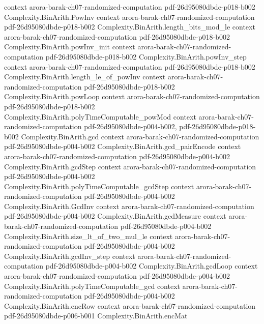 \begin{theorem}
  {context}
  {arora-barak-ch07-randomized-computation}
  {pdf-26d95080dbde-p018-b002}
\proofstep
  {Complexity.BinArith.PowInv}
  {context}
  {arora-barak-ch07-randomized-computation}
  {pdf-26d95080dbde-p018-b002}
\proofstep
  {Complexity.BinArith.length_bits_mod_le}
  {context}
  {arora-barak-ch07-randomized-computation}
  {pdf-26d95080dbde-p018-b002}
\proofstep
  {Complexity.BinArith.powInv_init}
  {context}
  {arora-barak-ch07-randomized-computation}
  {pdf-26d95080dbde-p018-b002}
\proofstep
  {Complexity.BinArith.powInv_step}
  {context}
  {arora-barak-ch07-randomized-computation}
  {pdf-26d95080dbde-p018-b002}
\proofstep
  {Complexity.BinArith.length_le_of_powInv}
  {context}
  {arora-barak-ch07-randomized-computation}
  {pdf-26d95080dbde-p018-b002}
\proofstep
  {Complexity.BinArith.powLoop}
  {context}
  {arora-barak-ch07-randomized-computation}
  {pdf-26d95080dbde-p018-b002}
\proofstep
  {Complexity.BinArith.polyTimeComputable_powMod}
  {context}
  {arora-barak-ch07-randomized-computation}
  {pdf-26d95080dbde-p004-b002,
    pdf-26d95080dbde-p018-b002}
\proofstep
  {Complexity.BinArith.gcd}
  {context}
  {arora-barak-ch07-randomized-computation}
  {pdf-26d95080dbde-p004-b002}
\proofstep
  {Complexity.BinArith.gcd_pairEncode}
  {context}
  {arora-barak-ch07-randomized-computation}
  {pdf-26d95080dbde-p004-b002}
\proofstep
  {Complexity.BinArith.gcdStep}
  {context}
  {arora-barak-ch07-randomized-computation}
  {pdf-26d95080dbde-p004-b002}
\proofstep
  {Complexity.BinArith.polyTimeComputable_gcdStep}
  {context}
  {arora-barak-ch07-randomized-computation}
  {pdf-26d95080dbde-p004-b002}
\proofstep
  {Complexity.BinArith.GcdInv}
  {context}
  {arora-barak-ch07-randomized-computation}
  {pdf-26d95080dbde-p004-b002}
\proofstep
  {Complexity.BinArith.gcdMeasure}
  {context}
  {arora-barak-ch07-randomized-computation}
  {pdf-26d95080dbde-p004-b002}
\proofstep
  {Complexity.BinArith.size_lt_of_two_mul_le}
  {context}
  {arora-barak-ch07-randomized-computation}
  {pdf-26d95080dbde-p004-b002}
\proofstep
  {Complexity.BinArith.gcdInv_step}
  {context}
  {arora-barak-ch07-randomized-computation}
  {pdf-26d95080dbde-p004-b002}
\proofstep
  {Complexity.BinArith.gcdLoop}
  {context}
  {arora-barak-ch07-randomized-computation}
  {pdf-26d95080dbde-p004-b002}
\proofstep
  {Complexity.BinArith.polyTimeComputable_gcd}
  {context}
  {arora-barak-ch07-randomized-computation}
  {pdf-26d95080dbde-p004-b002}
\proofstep
  {Complexity.BinArith.encRow}
  {context}
  {arora-barak-ch07-randomized-computation}
  {pdf-26d95080dbde-p006-b001}
\proofstep
  {Complexity.BinArith.encMat}

\end{theorem}

